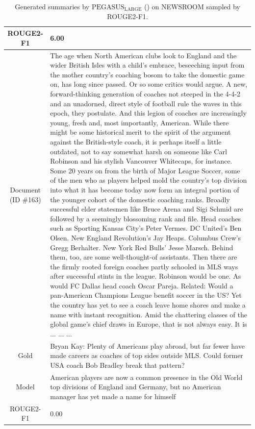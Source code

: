 \begin{table}[bth!]
\begin{tabular}{c|p{}}
\\ \hline
ROUGE2-F1 & 
6.00
\\ \hline
\makecell{Document\\(ID \#163)} & 
The age when North American clubs look to England and the wider British Isles with a child’s embrace, beseeching input from the mother country’s coaching bosom to take the domestic game on, has long since passed. Or so some critics would argue. A new, forward-thinking generation of coaches not steeped in the 4-4-2 and an unadorned, direct style of football rule the waves in this epoch, they postulate. And this legion of coaches are increasingly young, fresh and, most importantly, American. While there might be some historical merit to the spirit of the argument against the British-style coach, it is perhaps itself a little outdated, not to say somewhat harsh on someone like Carl Robinson and his stylish Vancouver Whitecaps, for instance. Some 20 years on from the birth of Major League Soccer, some of the men who as players helped mold the country’s top division into what it has become today now form an integral portion of the younger cohort of the domestic coaching ranks. Broadly successful elder statesmen like Bruce Arena and Sigi Schmid are followed by a seemingly blossoming rank and file. Head coaches such as Sporting Kansas City’s Peter Vermes. DC United’s Ben Olsen. New England Revolution’s Jay Heaps. Columbus Crew’s Gregg Berhalter. New York Red Bulls’ Jesse Marsch. Behind them, too, are some well-thought-of assistants. Then there are the firmly rooted foreign coaches partly schooled in MLS ways after successful stints in the league. Robinson would be one. As would FC Dallas head coach Oscar Pareja. Related: Would a pan-American Champions League benefit soccer in the US? Yet the country has yet to see a coach leave home shores and make a name with instant recognition. Amid the chattering classes of the global game’s chief draws in Europe, that is not always easy. It is ... ... ... 
\\ \hline
Gold & 
Bryan Kay: Plenty of Americans play abroad, but far fewer have made careers as coaches of top sides outside MLS. Could former USA coach Bob Bradley break that pattern?
\\ \hline
Model & 
American players are now a common presence in the Old World top divisions of England and Germany, but no American manager has yet made a name for himself
\\ \hline
ROUGE2-F1 & 
0.00
\\ \hline
\end{tabular}
\caption{Generated summaries by $\text{PEGASUS}_{\text{LARGE}}$ (\gnews) on NEWSROOM sampled by ROUGE2-F1.}
\end{table}
